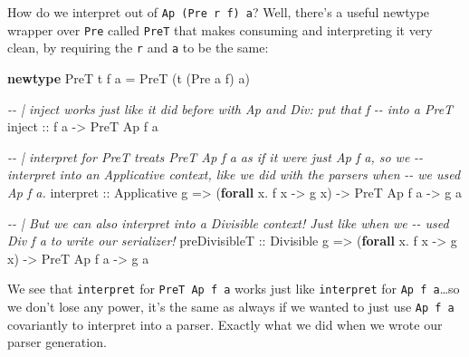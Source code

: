 \documentclass[]{article}
\newenvironment{Shaded}{}{}
\newcommand{\CommentTok}[1]{\textcolor[rgb]{0.38,0.63,0.69}{\textit{#1}}}
\newcommand{\DataTypeTok}[1]{\textcolor[rgb]{0.56,0.13,0.00}{#1}}
\newcommand{\KeywordTok}[1]{\textcolor[rgb]{0.00,0.44,0.13}{\textbf{#1}}}
\newcommand{\NormalTok}[1]{#1}
\newcommand{\OperatorTok}[1]{\textcolor[rgb]{0.40,0.40,0.40}{#1}}
\newcommand{\OtherTok}[1]{\textcolor[rgb]{0.00,0.44,0.13}{#1}}
\begin{document}
How do we interpret out of \texttt{Ap\ (Pre\ r\ f)\ a}? Well, there's a useful
newtype wrapper over \texttt{Pre} called \texttt{PreT} that makes consuming and
interpreting it very clean, by requiring the \texttt{r} and \texttt{a} to be the
same:

\begin{Shaded}
\begin{Highlighting}[]
\KeywordTok{newtype} \DataTypeTok{PreT}\NormalTok{ t f a }\OtherTok{=} \DataTypeTok{PreT}\NormalTok{ (t (}\DataTypeTok{Pre}\NormalTok{ a f) a)}

\CommentTok{{-}{-} | \textasciigrave{}inject\textasciigrave{} works just like it did before with \textasciigrave{}Ap\textasciigrave{} and \textasciigrave{}Div\textasciigrave{}: put that \textasciigrave{}f\textasciigrave{}}
\CommentTok{{-}{-} into a \textasciigrave{}PreT\textasciigrave{}}
\OtherTok{inject ::}\NormalTok{ f a }\OtherTok{{-}>} \DataTypeTok{PreT} \DataTypeTok{Ap}\NormalTok{ f a}

\CommentTok{{-}{-} | interpret for PreT treats \textasciigrave{}PreT Ap f a\textasciigrave{} as if it were just \textasciigrave{}Ap f a\textasciigrave{}, so we}
\CommentTok{{-}{-} interpret into an \textasciigrave{}Applicative\textasciigrave{} context, like we did with the parsers when}
\CommentTok{{-}{-} we used \textasciigrave{}Ap f a\textasciigrave{}.}
\NormalTok{interpret}
\OtherTok{    ::} \DataTypeTok{Applicative}\NormalTok{ g}
    \OtherTok{=>}\NormalTok{ (}\KeywordTok{forall}\NormalTok{ x}\OperatorTok{.}\NormalTok{ f x }\OtherTok{{-}>}\NormalTok{ g x)}
    \OtherTok{{-}>} \DataTypeTok{PreT} \DataTypeTok{Ap}\NormalTok{ f a}
    \OtherTok{{-}>}\NormalTok{ g a}

\CommentTok{{-}{-} | But we can also interpret into a \textasciigrave{}Divisible\textasciigrave{} context!  Just like when we}
\CommentTok{{-}{-} used \textasciigrave{}Div f a\textasciigrave{} to write our serializer!}
\NormalTok{preDivisibleT}
\OtherTok{    ::} \DataTypeTok{Divisible}\NormalTok{ g}
    \OtherTok{=>}\NormalTok{ (}\KeywordTok{forall}\NormalTok{ x}\OperatorTok{.}\NormalTok{ f x }\OtherTok{{-}>}\NormalTok{ g x)}
    \OtherTok{{-}>} \DataTypeTok{PreT} \DataTypeTok{Ap}\NormalTok{ f a}
    \OtherTok{{-}>}\NormalTok{ g a}
\end{Highlighting}
\end{Shaded}

We see that \texttt{interpret} for \texttt{PreT\ Ap\ f\ a} works just like
\texttt{interpret} for \texttt{Ap\ f\ a}\ldots so we don't lose any power, it's
the same as always if we wanted to just use \texttt{Ap\ f\ a} covariantly to
interpret into a parser. Exactly what we did when we wrote our parser
generation.
\end{document}

